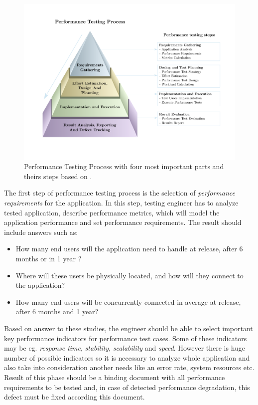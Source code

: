 \begin{figure}[H]
  \centering
  \includegraphics[width=16cm]{obrazky-figures/pyramid.pdf}
  \captionsetup{justification=centering}
  \caption{Performance Testing Process with four most important parts and theirs steps based on \cite{Sharma:HP}.}
  \label{fig:performace_testing_process}
\end{figure}

The first step of performance testing process is the selection of \emph{performance requirements} for the application. In this step, testing engineer has to analyze tested application, describe performance metrics, which will model the application performance and set performance requirements. The result should include answers such as:

\begin{itemize}
	\setlength\itemsep{0em}
	\item How many end users will the application need to handle at release, after 6 months or in 1 year ?
	\item Where will these users be physically located, and how will they connect to the application?
	\item How many end users will be concurrently connected in average at release, after 6 months and 1 year?
\end{itemize}

Based on answer to these studies, the engineer should be able to select important key performance indicators for performance test cases. Some of these indicators may be eg. \emph{response time}, \emph{stability}, \emph{scalability} and \emph{speed}. However there is huge number of possible indicators so it is necessary to analyze whole application and also take into consideration another needs like an error rate, system resources etc.  Result of this phase should be a binding document with all performance requirements to be tested and, in case of detected performance degradation, this defect must be fixed according this document.

